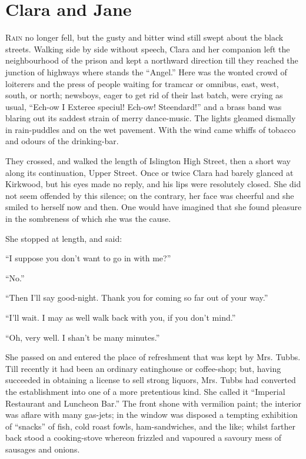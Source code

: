 \chapter{Clara and Jane}

\textsc{Rain} no longer fell, but the gusty and bitter wind still swept
about the black streets. Walking side by side without speech, Clara and
her companion left the neighbourhood of the prison and kept a northward
direction till they reached the junction of highways where stands the
``Angel.'' Here was the wonted crowd of loiterers and the press of
people waiting for tramcar or omnibus, east, west, south, or north;
newsboys, eager to get rid of their last batch, were crying as usual,
``Ech-ow I Exteree speciul! Ech-ow! Steendard!'' and a brass band was
blaring out its saddest strain of merry dance-music. The lights gleamed
dismally in rain-puddles and on the wet pavement. With the wind {}came
whiffs of tobacco and odours of the drinking-bar.

They crossed, and walked the length of Islington High Street, then a
short way along its continuation, Upper Street. Once or twice Clara had
barely glanced at Kirkwood, but his eyes made no reply, and his lips
were resolutely closed. She did not seem offended by this silence; on
the contrary, her face was cheerful and she smiled to herself now and
then. One would have imagined that she found pleasure in the sombreness
of which she was the cause.

She stopped at length, and said:

``I suppose you don't want to go in with me?''

``No.''

``Then I'll say good-night. Thank you for coming so far out of your
way.''

``I'll wait. I may as well walk back with you, if you don't mind.''

``Oh, very well. I shan't be many minutes.''

She passed on and entered the place of {}refreshment that was kept by
Mrs. Tubbs. Till recently it had been an ordinary eatinghouse or
coffee-shop; but, having succeeded in obtaining a license to sell strong
liquors, Mrs. Tubbs had converted the establishment into one of a more
pretentious kind. She called it ``Imperial Restaurant and Luncheon
Bar.'' The front shone with vermilion paint; the interior was aflare
with many gas-jets; in the window was disposed a tempting exhibition of
``snacks'' of fish, cold roast fowls, ham-sandwiches, and the like;
whilst farther back stood a cooking-stove whereon frizzled and vapoured
a savoury mess of sausages and onions.

